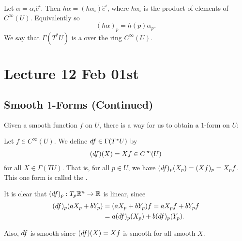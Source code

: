 \documentclass[notoc,notitlepage]{tufte-book}
\begin{document}
Let $\alpha = \alpha_i \hat{e}^i$. Then $h\alpha = (h\alpha_i)\hat{e}^i$, where $h \alpha_i$ is
the product of elements of $C^\infty(U)$. Equivalently so
\begin{equation*}
  (h\alpha)_p = h(p) \alpha_p.
\end{equation*}
We say that $\Gamma(T^* U)$ is a  over the ring $C^\infty(U)$.



\chapter{Lecture 12 Feb 01st}%
\label{chp:lecture_12_feb_01st}

\section{Smooth \texorpdfstring{$1$}{1}-Forms (Continued)}%
\label{sec:smooth_1_forms_continued}

Given a smooth function $f$ on $U$, there is a way for us to obtain a $1$-form on $U$:

\begin{defn}\label{defn:exterior_derivative_of_f_1_form_}
  Let $f \in C^\infty(U)$. We define $\mathop{}\!d{f} \in \Gamma(T^* U)$ by
  \begin{equation*}
    (\mathop{}\!d{f})(X) = Xf \in C^\infty(U)
  \end{equation*}
  for all $X \in \Gamma(TU)$. That is, for all $p \in U$, we have $(\mathop{}\!d{f})_p(X_p) = (Xf)_p
  = X_p f$. This one form is called the .
\end{defn}

\begin{note}
  It is clear that $(\mathop{}\!d{f})_p : T_p \mathbb{R}^n \to \mathbb{R}$ is linear, since
  \begin{align*}
    (\mathop{}\!d{f})_p(a X_p + b Y_p) &= (aX_p + bY_p) f = aX_p f + bY_p f \\
                               &= a(\mathop{}\!d{f})_p(X_p) + b(\mathop{}\!d{f})_p(Y_p).
  \end{align*}

  Also, $\mathop{}\!d{f}$ is smooth since $(\mathop{}\!d{f})(X) = Xf$ is smooth for all smooth $X$.
\end{note}
\end{document}
